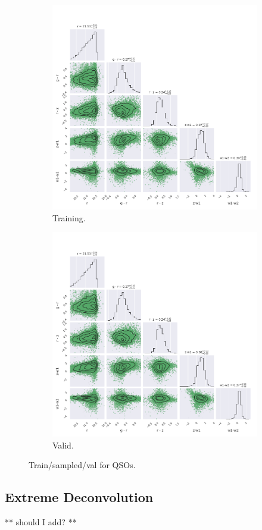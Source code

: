 \begin{figure}
\centering
\begin{subfigure}[b]{.5\textwidth}
  \centering
  \includegraphics[width=\textwidth]{images/gmm/qso_training.png}
  \caption{Training.}
  \label{fig:qso_train}
\end{subfigure}%
\begin{subfigure}[b]{.5\textwidth}
  \centering
  \includegraphics[width=\textwidth]{images/gmm/qso_valid.png}
  \caption{Valid.}
  \label{fig:lrg_valid}
\end{subfigure}
\caption{Train/sampled/val for QSOs.}
\label{fig:qso_gmm}
\end{figure}



\subsection{Extreme Deconvolution}

** should I add? **


